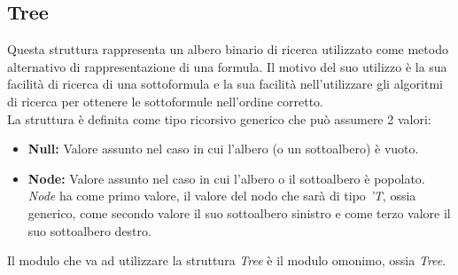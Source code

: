 \documentclass[\main/tesi.tex]{subfiles}
\begin{document}
\subsection{Tree}
Questa struttura rappresenta un albero binario di ricerca utilizzato come metodo alternativo di rappresentazione di una formula. Il motivo del suo utilizzo è la sua facilità di ricerca di una sottoformula e la sua facilità nell'utilizzare gli algoritmi di ricerca per ottenere le sottoformule nell'ordine corretto. \\
La struttura è definita come tipo ricorsivo generico che può assumere 2 valori:
\begin{itemize}
    \item \textbf{Null:} Valore assunto nel caso in cui l'albero (o un sottoalbero) è vuoto.
    \item \textbf{Node:} Valore assunto nel caso in cui l'albero o il sottoalbero è popolato. \textit{Node} ha come primo valore, il valore del nodo che sarà di tipo \textit{'T}, ossia generico, come secondo valore il suo sottoalbero sinistro e come terzo valore il suo sottoalbero destro.
\end{itemize}
Il modulo che va ad utilizzare la struttura \textit{Tree} è il modulo omonimo, ossia \textit{Tree}.
\end{document}
